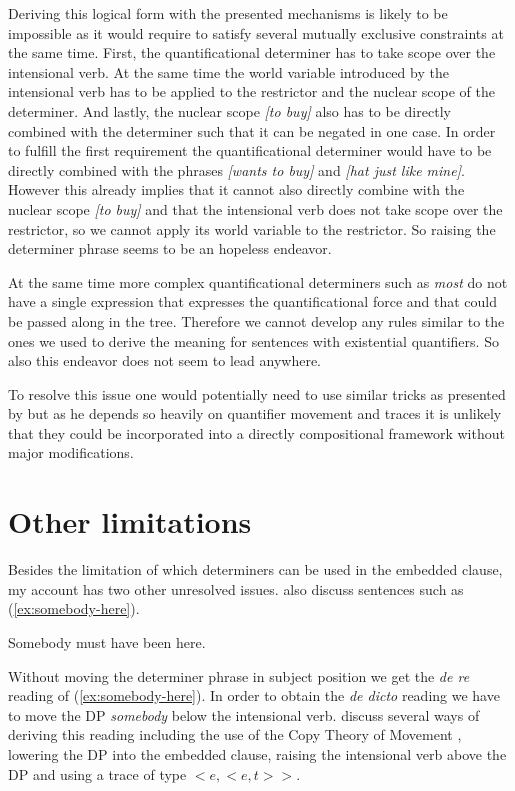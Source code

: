 \documentclass[parskip=half]{scrartcl}
\begin{document}
Deriving this logical form with the presented mechanisms is likely to be impossible as it would require to satisfy several mutually exclusive constraints at the same time. First, the quantificational determiner has to take scope over the intensional verb. At the same time the world variable introduced by the intensional verb has to be applied to the restrictor and the nuclear scope of the determiner. And lastly, the nuclear scope \textit{[to buy]} also has to be directly combined with the determiner such that it can be negated in one case. In order to fulfill the first requirement the quantificational determiner would have to be directly combined with the phrases \textit{[wants to buy]} and \textit{[hat just like mine]}. However this already implies that it cannot also directly combine with the nuclear scope \textit{[to buy]} and that the intensional verb does not take scope over the restrictor, so we cannot apply its world variable to the restrictor. So raising the determiner phrase seems to be an hopeless endeavor.

At the same time more complex quantificational determiners such as \textit{most} do not have a single expression that expresses the quantificational force and that could be passed along in the tree. Therefore we cannot develop any rules similar to the ones we used to derive the meaning for sentences with existential quantifiers. So also this endeavor does not seem to lead anywhere.

To resolve this issue one would potentially need to use similar tricks as presented by \cite{szabo2010} but as he depends so heavily on quantifier movement and traces it is unlikely that they could be incorporated into a directly compositional framework without major modifications.

\section{Other limitations}

Besides the limitation of which determiners can be used in the embedded clause, my account has two other unresolved issues.  \citet[Ch. 7]{Fintel2002} also discuss sentences such as (\ref{ex:somebody-here}).

\begin{exe}
\ex \label{ex:somebody-here} Somebody must have been here.
\end{exe}

Without moving the determiner phrase in subject position we get the \textit{de re} reading of (\ref{ex:somebody-here}). In order to obtain the \textit{de dicto} reading we have to move
the DP \textit{somebody} below the intensional verb.  \cite{Fintel2002}
discuss several ways of deriving this reading including the use of the Copy Theory of Movement \citep{chomsky1995}, lowering the DP into the embedded clause, 
raising the intensional verb above the DP and using a trace of type $<e,<e,t>>$. 
\end{document}
